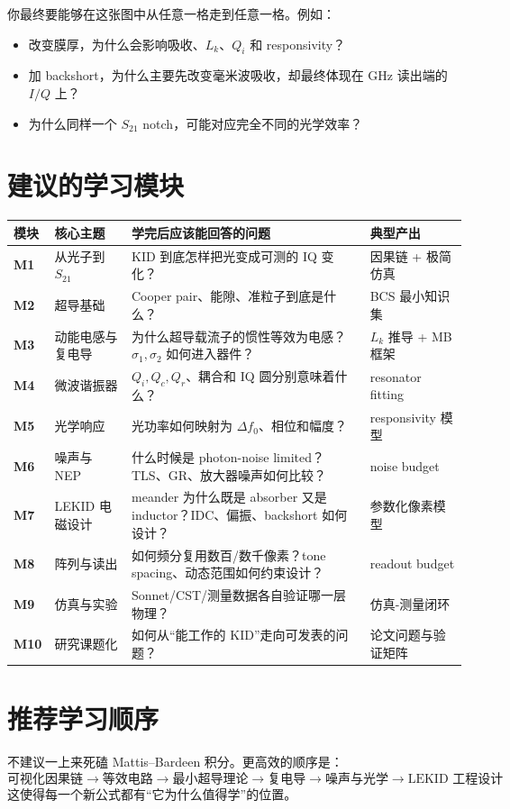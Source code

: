 \documentclass[11pt,a4paper,openany]{ctexrep}
\newcommand{\Stwentyone}{S_{21}}
\newcommand{\Lk}{L_k}
\begin{document}
你最终要能够在这张图中从任意一格走到任意一格。例如：
\begin{itemize}
  \item 改变膜厚，为什么会影响吸收、$\Lk$、$Q_i$ 和 responsivity？
  \item 加 backshort，为什么主要先改变毫米波吸收，却最终体现在 GHz 读出端的 $I/Q$ 上？
  \item 为什么同样一个 $\Stwentyone$ notch，可能对应完全不同的光学效率？
\end{itemize}

\section{建议的学习模块}
\renewcommand{\arraystretch}{1.25}
\noindent\begin{tabularx}{\textwidth}{>{\bfseries}p{1.5cm} p{4.0cm} X p{2.6cm}}
\toprule
模块 & 核心主题 & 学完后应该能回答的问题 & 典型产出 \\
\midrule
M1 & 从光子到 $\Stwentyone$ & KID 到底怎样把光变成可测的 IQ 变化？ & 因果链 + 极简仿真 \\
M2 & 超导基础 & Cooper pair、能隙、准粒子到底是什么？ & BCS 最小知识集 \\
M3 & 动能电感与复电导 & 为什么超导载流子的惯性等效为电感？$\sigma_1,\sigma_2$ 如何进入器件？ & $L_k$ 推导 + MB 框架 \\
M4 & 微波谐振器 & $Q_i,Q_c,Q_r$、耦合和 IQ 圆分别意味着什么？ & resonator fitting \\
M5 & 光学响应 & 光功率如何映射为 $\Delta f_0$、相位和幅度？ & responsivity 模型 \\
M6 & 噪声与 NEP & 什么时候是 photon-noise limited？TLS、GR、放大器噪声如何比较？ & noise budget \\
M7 & LEKID 电磁设计 & meander 为什么既是 absorber 又是 inductor？IDC、偏振、backshort 如何设计？ & 参数化像素模型 \\
M8 & 阵列与读出 & 如何频分复用数百/数千像素？tone spacing、动态范围如何约束设计？ & readout budget \\
M9 & 仿真与实验 & Sonnet/CST/测量数据各自验证哪一层物理？ & 仿真-测量闭环 \\
M10 & 研究课题化 & 如何从“能工作的 KID”走向可发表的问题？ & 论文问题与验证矩阵 \\
\bottomrule
\end{tabularx}

\section{推荐学习顺序}
不建议一上来死磕 Mattis--Bardeen 积分。更高效的顺序是：
\[
\boxed{
\text{可视化因果链}
\rightarrow
\text{等效电路}
\rightarrow
\text{最小超导理论}
\rightarrow
\text{复电导}
\rightarrow
\text{噪声与光学}
\rightarrow
\text{LEKID 工程设计}
}
\]
这使得每一个新公式都有“它为什么值得学”的位置。
\end{document}
